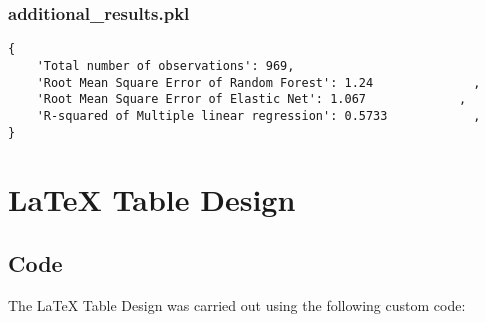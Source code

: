 \documentclass[11pt]{article}
\begin{document}
\subsubsection*{additional\_results.pkl}

\begin{Verbatim}[tabsize=4]
{
    'Total number of observations': 969,
    'Root Mean Square Error of Random Forest': 1.24              ,
    'Root Mean Square Error of Elastic Net': 1.067             ,
    'R-squared of Multiple linear regression': 0.5733            ,
}
\end{Verbatim}

\section{LaTeX Table Design}
\subsection{{Code}}
The LaTeX Table Design was carried out using the following custom code:
\end{document}
